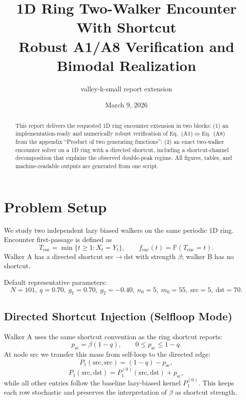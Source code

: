 \documentclass[11pt]{article}
\title{1D Ring Two-Walker Encounter With Shortcut\\\large Robust A1/A8 Verification and Bimodal Realization}
\author{valley-k-small report extension}
\date{March 9, 2026}
\begin{document}
\maketitle

\begin{abstract}
This report delivers the requested 1D ring encounter extension in two blocks:
(1) an implementation-ready and numerically robust verification of Eq.~(A1)$\Leftrightarrow$Eq.~(A8) from the appendix ``Product of two generating functions'';
(2) an exact two-walker encounter solver on a 1D ring with a directed shortcut, including a shortcut-channel decomposition that explains the observed double-peak regime.
All figures, tables, and machine-readable outputs are generated from one script.
\end{abstract}

\section{Problem Setup}
We study two independent lazy biased walkers on the same periodic 1D ring.
Encounter first-passage is defined as
\[
T_{\mathrm{enc}}=\min\{t\ge1:X_t=Y_t\},\qquad
f_{\mathrm{enc}}(t)=\mathbb P(T_{\mathrm{enc}}=t).
\]
Walker A has a directed shortcut $\mathrm{src}\to\mathrm{dst}$ with strength $\beta$; walker B has no shortcut.

Default representative parameters:
\[
N=101,\ q=0.70,\ g_1=0.70,\ g_2=-0.40,\ n_0=5,\ m_0=55,\ \mathrm{src}=5,\ \mathrm{dst}=70.
\]

\subsection*{Directed Shortcut Injection (Selfloop Mode)}
Walker A uses the same shortcut convention as the ring shortcut reports:
\[
p_{\mathrm{sc}}=\beta(1-q),\qquad 0\le p_{\mathrm{sc}}\le 1-q.
\]
At node $\mathrm{src}$ we transfer this mass from self-loop to the directed edge:
\[
P_1(\mathrm{src},\mathrm{src})=(1-q)-p_{\mathrm{sc}},
\]
\[
P_1(\mathrm{src},\mathrm{dst})=P_1^{(0)}(\mathrm{src},\mathrm{dst})+p_{\mathrm{sc}},
\]
while all other entries follow the baseline lazy-biased kernel $P_1^{(0)}$. This keeps each row stochastic and preserves the interpretation of $\beta$ as shortcut strength.
\end{document}
